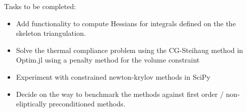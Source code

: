 Tasks to be completed:

\begin{itemize}
    \item [DONE] Add functionality to compute Hessians for integrals defined on the the skeleton triangulation.
    \item Solve the thermal compliance problem using the CG-Steihaug method in Optim.jl using a penalty method for the volume constraint
    \item Experiment with constrained newton-krylov methods in SciPy
    \item Decide on the way to benchmark the methods against first order / non-eliptically preconditioned methods.
\end{itemize}

